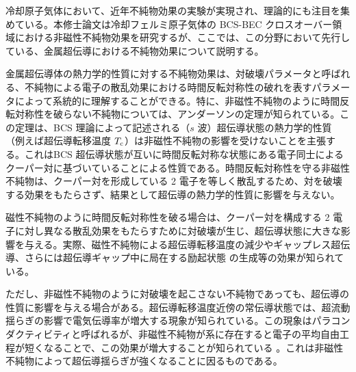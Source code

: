 


冷却原子気体において、近年不純物効果の実験が実現され\cite{kharamov2012,konishi2016,billy2008,jendrezejewski2012}、理論的にも注目を集めている\cite{han2011,palestini2013,che2016}。本修士論文は冷却フェルミ原子気体の BCS-BEC クロスオーバー領域における非磁性不純物効果を研究するが、ここでは、この分野において先行している、金属超伝導における不純物効果について説明する。

金属超伝導体の熱力学的性質に対する不純物効果は、対破壊パラメータと呼ばれる、不純物による電子の散乱効果における時間反転対称性の破れを表すパラメータによって系統的に理解することができる\cite{abrikosov1961,maki1968}。特に、非磁性不純物のように時間反転対称性を破らない不純物については、アンダーソンの定理が知られている\cite{anderson1959}。この定理は、BCS 理論によって記述される（$s$ 波）超伝導状態の熱力学的性質（例えば超伝導転移温度 $T_{\text{c}}$）は非磁性不純物の影響を受けないことを主張する。これはBCS 超伝導状態が互いに時間反転対称な状態にある電子同士によるクーパー対に基づいていることによる性質である。時間反転対称性を守る非磁性不純物は、クーパー対を形成している 2 電子を等しく散乱するため、対を破壊する効果をもたらさず、結果として超伝導の熱力学的性質に影響を与えない。

磁性不純物のように時間反転対称性を破る場合は、クーパー対を構成する 2 電子に対し異なる散乱効果をもたらすために対破壊が生じ、超伝導状態に大きな影響を与える。実際、磁性不純物による超伝導転移温度の減少\cite{abrikosov1961}やギャップレス超伝導\cite{maki1968}、さらには超伝導ギャップ中に局在する励起状態\cite{yazdani1997,shiba1968,shiba1973} の生成等の効果が知られている。

ただし、非磁性不純物のように対破壊を起こさない不純物であっても、超伝導の性質に影響を与える場合がある。超伝導転移温度近傍の常伝導状態では、超流動揺らぎの影響で電気伝導率が増大する現象が知られている\cite{Ferrell1969}。この現象はパラコンダクティビティと呼ばれるが、非磁性不純物が系に存在すると電子の平均自由工程が短くなることで、この効果が増大することが知られている \cite{Ferrell1969}。これは非磁性不純物によって超伝導揺らぎが強くなることに因るものである。

